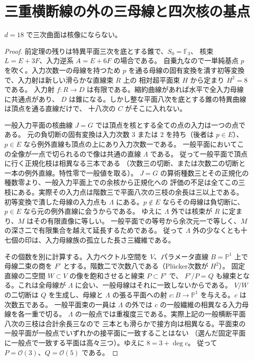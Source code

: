 \section{三重横断線の外の三母線と四次核の基点}
\label{sec:cofactor-triple-transversal}
\begin{theorem}\label{thm:cofactor-eighteen-no-cubic}
$d=18$ で三次曲面は核像にならない。
\end{theorem}
\begin{proof}
前定理の残りは特異平面三次を底とする錐で、$S_0=\mathbb F_3$、
核束 $L=E+3F$、入力逆系 $A=E+6F$ の場合である。
自乗九なので一単純基点 $p$ を吹く。入力次数一の母線を持つため
$p$ を通る母線の固有変換を潰す初等変換で、入力射は新しい滑らかな直線束 $R$ 上の
相対超平面束 $H$ から定まり $H^2=8$ である。
入力射 $f:R\to D$ は有限である。縮約曲線があれば水平で全入力母線に共通点があり、
$D$ は錐になる。しかし整な平面八次を底とする錐の特異曲線は頂点を通る直線だけで、
十八次の $C$ がそこに入れない。

一般入力平面の核曲線 $J=G$ では頂点を核とする全ての点の入力は一つの点である。
元の負切断の固有変換は入力次数 $3$ または $2$ を持ち（後者は $p\in E$）、
$p\in E$ なら例外直線も頂点の上にあり入力次数一である。
一般平面においてこの全像が一点で切られるので像は共通の直線 $\Lambda$ である。
従って一般平面で頂点に行く正規化枝は相異なる三本である
（次数三の切断、または次数二の切断と一本の例外直線。特性零で一般値を取る）。
$J=G$ の算術種数三とその正規化の種数零より、一般入力平面上での余核から正規化への
評価の不足は全てこの三枝にある。実際その入力点は階数三で平面八次の三枝の余長は三以上である。
初等変換で潰した母線の入力点も $\Lambda$ にある。$p\notin E$ ならその母線は負切断に、
$p\in E$ なら元の例外直線に会うからである。
ゆえに $\Lambda$ 外では核束が $R$ に定まり、$M$ はその有限直像に等しい。
一般平面での等号から余次元一で等しく、$M$ の深さ二で有限集合を越えて延長するためである。
従って $\Lambda$ 外の少なくとも十七個の印は、入力母線族の孤立した長さ三繊維である。

その個数を別に計算する。入力ベクトル空間を $V$、パラメータ直線 $B=\mathbb P^1$ 上で
母線二束の商を $F'$ とする。階数二で次数八である（Plücker次数が $H^2$）。
固定直線の二空間 $W\subset V$ の像を飽和させると線束 $P\subset F'$ で、
$F'/P=Q$ も線束となる。これは全母線が $\Lambda$ に会い、一般母線はそれに一致しないからである。
$V/W$ の二切断は $Q$ を生成し、母線と $\Lambda$ の張る平面への射
$c:B\to\mathbb P^1$ を与える。$c$ は次数五である。
一般平面束の一員は $\Lambda$ の外では $c$ の一般繊維の相異なる入力母線を各一重で切る。
$\Lambda$ の一般点では重複度三である。実際上記の一般横断平面八次の三枝は合計余長三なので
三本とも滑らかで接方向は相異なる。平面束の一般平面が一般点でいずれかの接平面に一致することはない
（選んだ固定平面に一般点で一致する平面は高々三つ）。ゆえに $8=3+\deg c$。
従って $P=\mathcal O(3)$、$Q=\mathcal O(5)$ である。


\end{proof}
